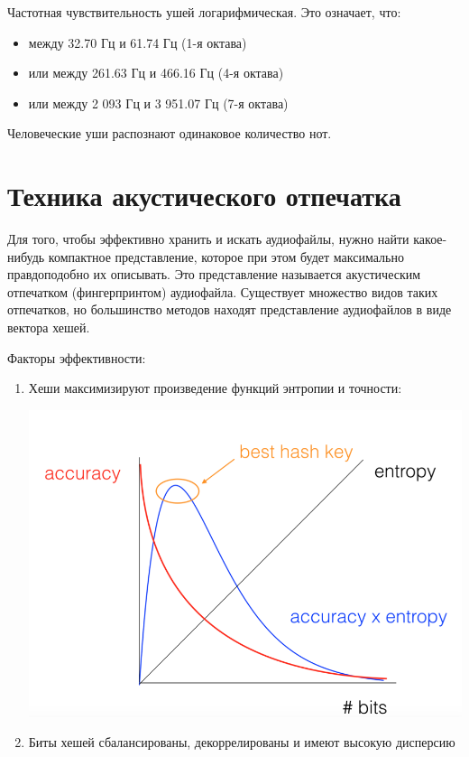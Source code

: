 
Частотная чувствительность ушей логарифмическая. Это означает, что:
\begin{itemize}
    \item между 32.70 Гц и 61.74 Гц (1-я октава)
    \item или между 261.63 Гц и 466.16 Гц (4-я октава)
    \item или между 2 093 Гц и 3 951.07 Гц (7-я октава)
\end{itemize}

Человеческие уши распознают одинаковое количество нот.


\section{Техника акустического отпечатка}
Для того, чтобы эффективно хранить и искать аудиофайлы, нужно
найти какое-нибудь компактное представление, которое при этом будет
максимально правдоподобно их описывать.
Это представление называется акустическим отпечатком (фингерпринтом) аудиофайла.
Существует множество видов таких отпечатков, но большинство методов
находят представление аудиофайлов в виде вектора хешей.

Факторы эффективности:
\begin{enumerate}[label=\arabic*.]
    \item Хеши максимизируют произведение функций энтропии и точности:
    \begin{center}
        \includegraphics[scale=0.6]{inc/img/best_hp.png}
    \end{center}
    \item Биты хешей сбалансированы, декоррелированы и имеют высокую дисперсию
\end{enumerate}


